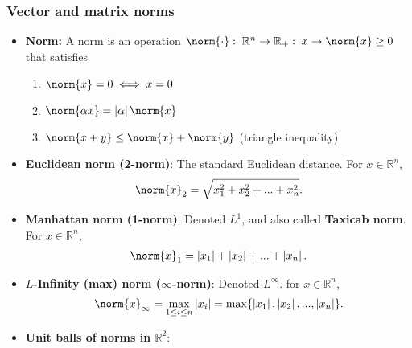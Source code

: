 \documentclass{report}
\begin{document}
    \subsubsection{Vector and matrix norms}
    \begin{itemize}
        \item \textbf{Norm:} A norm is an operation $\norm{\cdot }:\; \mathbb{R}^{n} \to \mathbb{R}_{+}:\; x \to \norm{x} \geq 0$  that satisfies
            \begin{enumerate}
                \item $\norm{x} = 0 \iff x = 0$
                \item $\norm{\alpha x} = \left\lvert \alpha \right\rvert \norm{x} $
                \item $\norm{x+y} \leq \norm{x} + \norm{y} $ (triangle inequality)
            \end{enumerate}
        \item \textbf{Euclidean norm (2-norm)}: The standard Euclidean distance. For $x \in \mathbb{R}^{n}$,
            \begin{align*}
                \norm{x}_{2} = \sqrt{x_{1}^{2} + x_{2}^{2} + ... + x_{n}^{2}}
            .\end{align*}
        \item \textbf{Manhattan norm (1-norm)}: Denoted $L^{1} $, and also called \textbf{Taxicab norm}. For $x \in \mathbb{R}^{n} $,
            \begin{align*}
                \norm{x}_{1} = \left\lvert x_{1} \right\rvert + \left\lvert x_{2} \right\rvert + ... + \left\lvert x_{n} \right\rvert
            .\end{align*}
        \item \textbf{$L$-Infinity (max) norm ($\infty$-norm)}: Denoted $L^{\infty}$. for $x\in \mathbb{R}^{n}$,
            \begin{align*}
                \norm{x}_{\infty} = \max_{1 \leq i \leq n} \left\lvert x_{i} \right\rvert = \max\{\left\lvert x_{1} \right\rvert, \left\lvert x_{2} \right\rvert, ..., \left\lvert x_{n} \right\rvert\} 
            .\end{align*}
        \item \textbf{Unit balls of norms in $\mathbb{R}^{2}$}:
                \begin{figure}[h]
                    \centering
                    \label{fig:2norm}
                \end{figure}
            \begin{itemize}

\end{itemize}
\end{itemize}
\end{document}
